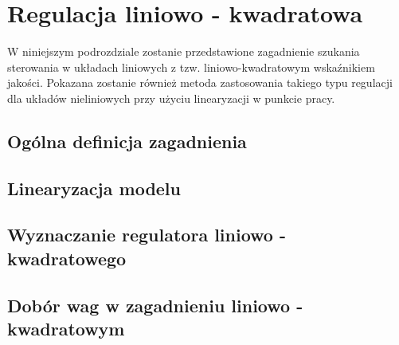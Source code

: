 \section{Regulacja liniowo - kwadratowa}
\label{sec:lqr}

W niniejszym podrozdziale zostanie przedstawione zagadnienie szukania sterowania w układach liniowych z tzw. liniowo-kwadratowym wskaźnikiem jakości. Pokazana zostanie również metoda zastosowania takiego typu regulacji dla układów nieliniowych przy użyciu linearyzacji w punkcie pracy.

\subsection{Ogólna definicja zagadnienia}
\label{sub:lqr-def}


\subsection{Linearyzacja modelu}
\label{sub:lqr-lin}


\subsection{Wyznaczanie regulatora liniowo - kwadratowego}
\label{sub:lqr-ctrl}


\subsection{Dobór wag w zagadnieniu liniowo - kwadratowym}
\label{sub:lqr-weights}
